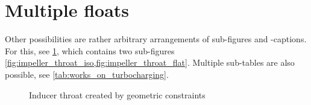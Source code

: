 \section{Multiple floats}
Other possibilities are rather arbitrary arrangements of sub-figures and -captions.
For this, see \cref{fig:impeller_throat}, which contains two sub-figures \cref{fig:impeller_throat_iso,fig:impeller_throat_flat}.
Multiple sub-tables are also possible, see \cref{tab:works_on_turbocharging}.
\begin{figure}
%
{%
	\caption[Impeller Throat]%
	{%
		Inducer throat created by geometric constraints%
	}%
	\label{fig:impeller_throat}%
}%
\end{figure}
